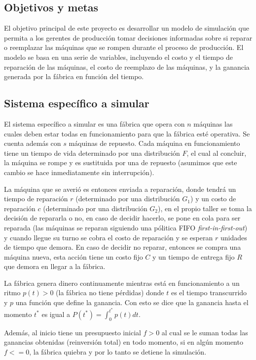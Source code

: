 \documentclass[10pt,twocolumn]{article}
\begin{document}
\subsection{Objetivos y metas}
El objetivo principal de este proyecto es desarrollar un modelo de simulación que permita a los gerentes de producción tomar decisiones informadas sobre si reparar o reemplazar las máquinas que se rompen durante el proceso de producción. El modelo se basa en una serie de variables, incluyendo el costo y el tiempo de reparación de las máquinas, el costo de reemplazo de las máquinas, y la ganancia generada por la fábrica en función del tiempo.

\subsection{Sistema específico a simular}
El sistema específico a simular es una fábrica que opera con $n$ máquinas las cuales deben estar todas en funcionamiento para que la fábrica esté operativa. Se cuenta además con $s$ máquinas de repuesto. Cada máquina en funcionamiento tiene un tiempo de vida determinado por una distribución $F$, el cual al concluir, la máquina se rompe y es sustituida por una de repuesto (asumimos que este cambio se hace inmediatamente sin interrupción). 

La máquina que se averió es entonces enviada a reparación, donde tendrá un tiempo de reparación $r$ (determinado por una distribución $G_{1}$) y un costo de reparación $c$ (determinado por una distribución $G_{2}$), en el propio taller se toma la decisión de repararla o no, en caso de decidir hacerlo, se pone en cola para ser reparada (las máquinas se reparan siguiendo una pólitica FIFO \textit{first-in-first-out}) y cuando llegue su turno se cobra el costo de reparación y se esperan $r$ unidades de tiempo que demora. En caso de decidir no reparar, entonces se compra una máquina nueva, esta acción tiene un costo fijo $C$ y un tiempo de entrega fijo $R$ que demora en llegar a la fábrica.

La fábrica genera dinero continuamente mientras está en funcionamiento a un ritmo $p(t) > 0$ (la fábrica no tiene pérdidas) donde $t$ es el tiempo transcurrido y $p$ una función que define la ganancia. Con esto se dice que la ganancia hasta el momento $t^{*}$ es igual a $P(t^{*}) = \int_{0}^{t^{*}} {p(t)dt}$.

Además, al inicio tiene un presupuesto inicial $f > 0$ al cual se le suman todas las ganancias obtenidas (reinversión total) en todo momento, si en algún momento $f <= 0$, la fábrica quiebra y por lo tanto se detiene la simulación. 
\end{document}
